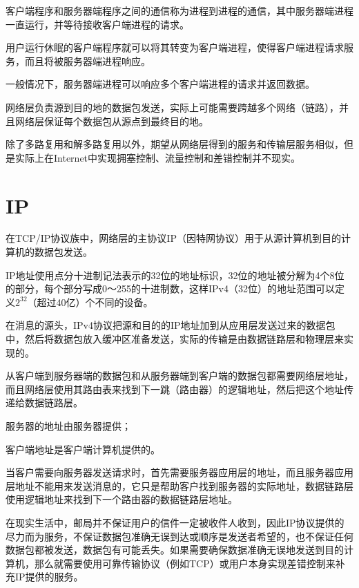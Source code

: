 客户端程序和服务器端程序之间的通信称为进程到进程的通信，其中服务器端进程一直运行，并等待接收客户端进程的请求。

用户运行休眠的客户端程序就可以将其转变为客户端进程，使得客户端进程请求服务，而且将被服务器端进程响应。

一般情况下，服务器端进程可以响应多个客户端进程的请求并返回数据。

网络层负责源到目的地的数据包发送，实际上可能需要跨越多个网络（链路），并且网络层保证每个数据包从源点到最终目的地。

除了多路复用和解多路复用以外，期望从网络层得到的服务和传输层服务相似，但是实际上在Internet中实现拥塞控制、流量控制和差错控制并不现实。



\section{IP}

在TCP/IP协议族中，网络层的主协议IP（因特网协议）用于从源计算机到目的计算机的数据包发送。



IP地址使用点分十进制记法表示的32位的地址标识，32位的地址被分解为4个8位的部分，每个部分写成0～255的十进制数，这样IPv4（32位）的地址范围可以定义$2^{32}$（超过40亿）个不同的设备。

在消息的源头，IPv4协议把源和目的的IP地址加到从应用层发送过来的数据包中，然后将数据包放入缓冲区准备发送，实际的传输是由数据链路层和物理层来实现的。

从客户端到服务器端的数据包和从服务器端到客户端的数据包都需要网络层地址，而且网络层使用其路由表来找到下一跳（路由器）的逻辑地址，然后把这个地址传递给数据链路层。

\begin{compactitem}
\item 服务器的地址由服务器提供；
\item 客户端地址是客户端计算机提供的。
\end{compactitem}

当客户需要向服务器发送请求时，首先需要服务器应用层的地址，而且服务器应用层地址不能用来发送消息的，它只是帮助客户找到服务器的实际地址，数据链路层使用逻辑地址来找到下一个路由器的数据链路层地址。


在现实生活中，邮局并不保证用户的信件一定被收件人收到，因此IP协议提供的尽力而为服务，不保证数据包准确无误到达或顺序是发送者希望的，也不保证任何数据包都被发送，数据包有可能丢失。如果需要确保数据准确无误地发送到目的计算机，那么就需要使用可靠传输协议（例如TCP）或用户本身实现差错控制来补充IP提供的服务。

